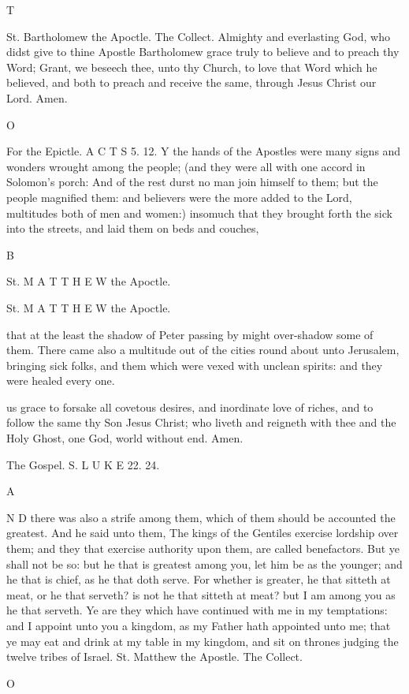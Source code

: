 T

St. Bartholomew the Apoctle. The Collect. Almighty and everlasting God, who didst give to thine Apostle Bartholomew grace truly to believe and to preach thy Word; Grant, we beseech thee, unto thy Church, to love that Word which he believed, and both to preach and receive the same, through Jesus Christ our Lord. Amen.

O

For the Epictle. A C T S 5. 12. Y the hands of the Apostles were many signs and wonders wrought among the people; (and they were all with one accord in Solomon’s porch: And of the rest durst no man join himself to them; but the people magnified them: and believers were the more added to the Lord, multitudes both of men and women:) insomuch that they brought forth the sick into the streets, and laid them on beds and couches,

B

St. M A T T H E W the Apoctle.

St. M A T T H E W the Apoctle.

that at the least the shadow of Peter passing by might over-shadow some of them. There came also a multitude out of the cities round about unto Jerusalem, bringing sick folks, and them which were vexed with unclean spirits: and they were healed every one.

us grace to forsake all covetous desires, and inordinate love of riches, and to follow the same thy Son Jesus Christ; who liveth and reigneth with thee and the Holy Ghost, one God, world without end. Amen.

The Gospel. S. L U K E 22. 24.

A

N D there was also a strife among them, which of them should be accounted the greatest. And he said unto them, The kings of the Gentiles exercise lordship over them; and they that exercise authority upon them, are called benefactors. But ye shall not be so: but he that is greatest among you, let him be as the younger; and he that is chief, as he that doth serve. For whether is greater, he that sitteth at meat, or he that serveth? is not he that sitteth at meat? but I am among you as he that serveth. Ye are they which have continued with me in my temptations: and I appoint unto you a kingdom, as my Father hath appointed unto me; that ye may eat and drink at my table in my kingdom, and sit on thrones judging the twelve tribes of Israel. St. Matthew the Apostle. The Collect.

O


